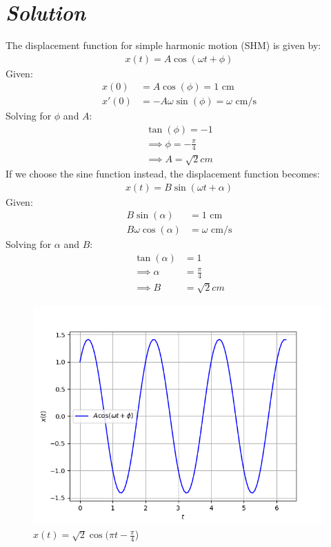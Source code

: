 \documentclass[journal,12pt,twocolumn]{IEEEtran}
\theoremstyle{remark}
\begin{document}
\section*{\textit{\textbf{Solution}}}

The displacement function for simple harmonic motion (SHM) is given by:
\begin{align}
   x(t) = A \cos(\omega t + \phi)  
\end{align}
Given:
\begin{align}
     x(0)&= A \cos(\phi) = 1 \text{ cm} \\
 x'(0)&= -A \omega \sin(\phi) = \omega \text{ cm/s} \label{eq:3}
 \end{align}
Solving for $\phi$ and $A$:
\begin{align}
    \tan(\phi) = -1\\
\implies
\phi = -\frac{\pi}{4} \\
\implies 
A= \sqrt{2}cm
\end{align}
If we choose the sine function instead, the displacement function becomes:
\begin{align}
    x(t) = B \sin(\omega t + \alpha) 
    \end{align}
    Given:\\
    \begin{align}
     B \sin(\alpha) &= 1 \text{ cm} \\
    B \omega \cos(\alpha) &= \omega \text{ cm/s}\label{eq;11}
\end{align}
Solving for $\alpha$ and $B$:
\begin{align}
    \tan(\alpha)& = 1\\
\implies
\alpha &= \frac{\pi}{4} \\
\implies 
B &=\sqrt{2}cm
\end{align}
\begin{figure}[h]
\renewcommand\thefigure{1}
    \centering
    \includegraphics[width=0.8\columnwidth]{figs/fig1.png}
    \caption{$x(t) = \sqrt{2}\cos(\pi t - \frac{\pi}{4}$)}
    \label{Fig1}
\end{figure}
\end{document}
